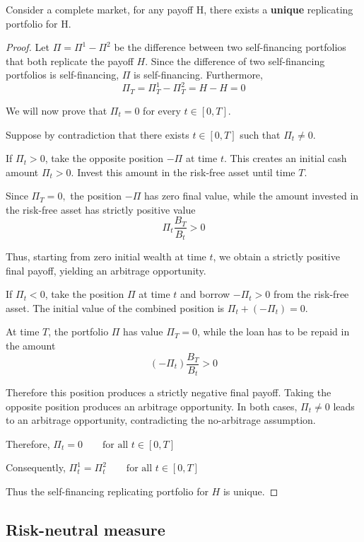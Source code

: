 Consider a complete market, for any payoff H, there exists a \textbf{unique} replicating portfolio for H.

\begin{proof}

Let $\Pi = \Pi^1-\Pi^2$ be the difference between two self-financing portfolios that both replicate the payoff $H$.
Since the difference of two self-financing portfolios is self-financing, $\Pi$ is self-financing. Furthermore,
$$\Pi_T=\Pi_T^1-\Pi_T^2=H-H=0$$

We will now prove that $\Pi_t=0$ for every $t\in[0,T]$.

Suppose by contradiction that there exists $t\in[0,T]$ such that $\Pi_t \neq 0$.

If $\Pi_t>0$, take the opposite position $-\Pi$ at time $t$. This creates an initial cash amount $\Pi_t>0$. 
Invest this amount in the risk-free asset until time $T$. 

Since $\Pi_T=0,$ the position $-\Pi$ has zero final value, while the amount invested in the risk-free asset has strictly positive value
$$\Pi_t\frac{B_T}{B_t}>0$$

Thus, starting from zero initial wealth at time $t$, we obtain a strictly positive final payoff, yielding an arbitrage opportunity.

If $\Pi_t<0$, take the position $\Pi$ at time $t$ and borrow $-\Pi_t>0$ from the risk-free asset. The initial value of the combined position is $\Pi_t+(-\Pi_t)=0$.

At time $T$, the portfolio $\Pi$ has value $\Pi_T=0$, while the loan has to be repaid in the amount
$$(-\Pi_t)\frac{B_T}{B_t}>0$$

Therefore this position produces a strictly negative final payoff. Taking the opposite position produces an arbitrage opportunity.
In both cases, $\Pi_t \neq 0$ leads to an arbitrage opportunity, contradicting the no-arbitrage assumption.

Therefore, $\Pi_t=0\qquad\text{for all }t\in[0,T]$

Consequently, $\Pi_t^1=\Pi_t^2\qquad\text{for all }t\in[0,T]$

Thus the self-financing replicating portfolio for $H$ is unique.
\end{proof}



\subsection{Risk-neutral measure}

